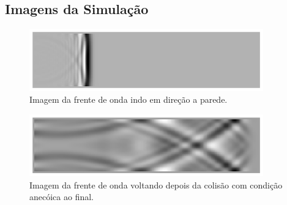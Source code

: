 \subsection{Imagens da Simulação}
\begin{figure}[h!]
    \centering
 	\hspace{-1.5cm}
    \includegraphics[width=0.9\textwidth]{code_matlab/code_refactored/closed-anechoic/normal.eps}
    \caption{Imagem da frente de onda indo em direção a parede.}
    \label{fig10}
\end{figure}
\begin{figure}[h!]
    \centering
 	\hspace{-1.5cm}
    \includegraphics[width=0.9\textwidth]{code_matlab/code_refactored/closed-anechoic/print_c_a.eps}
    \caption{Imagem da frente de onda voltando depois da colisão com condição anecóica ao final.}
    \label{fig11}
\end{figure}

\newpage
